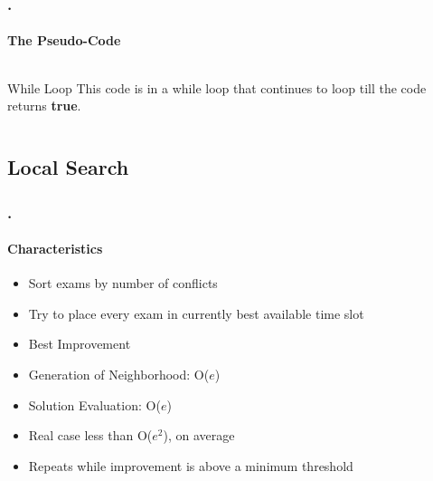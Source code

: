\documentclass{beamer}
\begin{document}
	\begin{frame}
	\frametitle{\thesection.\thesubsection \ \insertsubsection}
	\framesubtitle{The Pseudo-Code}
	\begin{columns}[onlytextwidth]
\begin{block}{While Loop}
	This code is in a while loop that continues to loop till the code returns \textbf{true}.
\end{block}
\end{columns}
	\end{frame}

	

   \subsection{Local Search}
   
   \begin{frame}
   \frametitle{\thesection.\thesubsection \ \insertsubsection}
   \framesubtitle{Characteristics}
   	
   \begin{itemize}
   	\item Sort exams by number of conflicts
   	\item Try to place every exam in currently best available time slot
   	\item Best Improvement
   	\item Generation of Neighborhood: O($e$)
   	\item Solution Evaluation: O($e$)
   	\item Real case less than O($e^2$), on average
   	\item Repeats while improvement is above a minimum threshold
   \end{itemize}
 
\end{frame}
\end{document}
